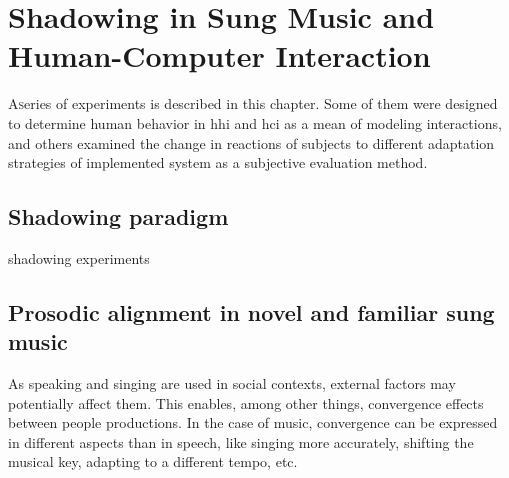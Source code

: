 \chapter{Shadowing in Sung Music and Human-Computer Interaction}
\label{chap:shadowing_in_sung_music_and_human_computer_interaction}

\lettrine{A} series of experiments is described in this chapter.
Some of them were designed to determine human behavior in \acl{hhi} and \ac{hci} as a mean of modeling interactions, and others examined the change in reactions of subjects to different adaptation strategies of implemented system as a subjective evaluation method.

\pagebreak

\section{Shadowing paradigm}
\label{sec:shadowing_paradigm}

shadowing experiments \citep{Goldinger1998echoes}\\


\section{Prosodic alignment in novel and familiar sung music}
\label{sec:alignment_in_novel_and_familiar_sung_music}




As speaking and singing are used in social contexts, external factors may potentially affect them.
This enables, among other things, convergence effects between people productions.
In the case of music, convergence can be expressed in different aspects than in speech, like singing more accurately, shifting the musical key, adapting to a different tempo, etc.

